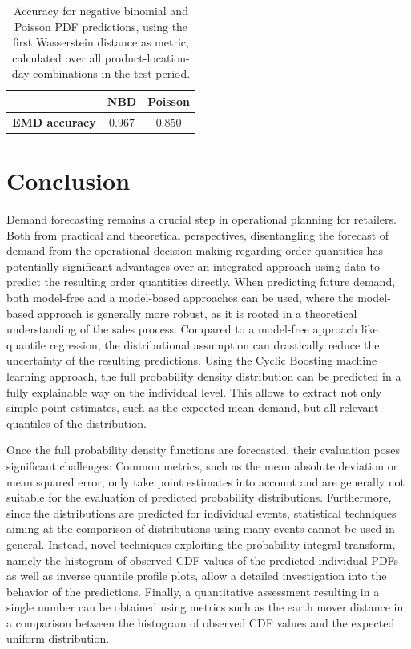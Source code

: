\documentclass[BCOR=1mm, DIV=calc,10pt,
twoside=true,
twocolumn,
headings=normal]{scrartcl}
\begin{document}
\begin{table}[h!]
\begin{center}
\caption{Accuracy for negative binomial and Poisson PDF predictions, using the first Wasserstein distance as metric, calculated over all product-location-day combinations in the test period.}
\label{tab:cdf_acc}
\begin{tabular}{c|c|c}
 & \textbf{NBD} & \textbf{Poisson} \\
\hline
\textbf{EMD accuracy} & 0.967 & 0.850
\end{tabular}
\end{center}
\end{table}


\section{Conclusion}
Demand forecasting remains a crucial step in operational planning for retailers. Both from practical and theoretical perspectives, disentangling the forecast of demand from the operational decision making regarding order quantities has potentially significant advantages over an integrated approach using data to predict the resulting order quantities directly. When predicting future demand, both model-free and a model-based approaches can be used, where the model-based approach is generally more robust, as it is rooted in a theoretical understanding of the sales process. Compared to a model-free approach like quantile regression, the distributional assumption can drastically reduce the uncertainty of the resulting predictions. Using the Cyclic Boosting machine learning approach, the full probability density distribution can be predicted in a fully explainable way on the individual level. This allows to extract not only simple point estimates, such as the expected mean demand, but all relevant quantiles of the distribution.

Once the full probability density functions are forecasted, their evaluation poses significant challenges: Common metrics, such as the mean absolute deviation or mean squared error, only take point estimates into account and are generally not suitable for the evaluation of predicted probability distributions. Furthermore, since the distributions are predicted for individual events, statistical techniques aiming at the comparison of distributions using many events cannot be used in general. Instead, novel techniques exploiting the probability integral transform, namely the histogram of observed CDF values of the predicted individual PDFs as well as inverse quantile profile plots, allow a detailed investigation into the behavior of the predictions. Finally, a quantitative assessment resulting in a single number can be obtained using metrics such as the earth mover distance in a comparison between the histogram of observed CDF values and the expected uniform distribution.
\end{document}
